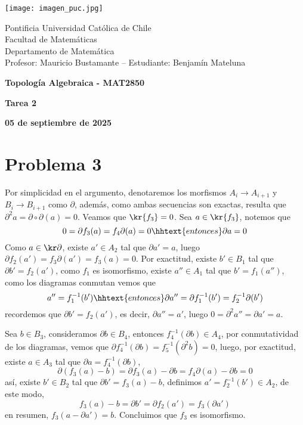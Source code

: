 \documentclass{article}
\begin{document}
\begin{minipage}{2.5cm}
    \texttt{[image: imagen\_puc.jpg]}
\end{minipage}
\begin{minipage}{14cm}
    {\sc Pontificia Universidad Católica de Chile\\
    Facultad de Matemáticas\\
    Departamento de Matemática\\
    Profesor: Mauricio Bustamante -- Estudiante: Benjamín Mateluna}
\end{minipage}
\vspace{1ex}

{\centerline{\bf Topología Algebraica - MAT2850}
\centerline{\bf Tarea 2}}
\centerline{\bf 05 de septiembre de 2025}

\section*{Problema 3} 
\noindent Por simplicidad en el argumento, denotaremos los morfismos $A_{i}\to A_{i+1}$ y 
$B_{i}\to B_{i+1}$ como $\partial$, además, como ambas secuencias son exactas, resulta que 
$\partial^{2}a=\partial\circ\partial (a)=0$. Veamos que $\kr{f_{3}}=0$. Sea $a\in\kr{f_{3}}$,
notemos que
\begin{equation*}
    0=\partial f_{3}(a)=f_{4}\partial(a)=0\hhtext{entonces}\partial a=0
\end{equation*}
Como $a\in\kr\partial$, existe $a'\in A_{2}$ tal que $\partial a'=a$, luego $\partial f_{2}(a')
=f_{3}\partial(a')=f_{3}(a)=0$. Por exactitud, existe $b'\in B_{1}$ tal que $\partial b'
=f_{2}(a')$, como $f_{1}$ es isomorfismo, existe $a''\in A_{1}$ tal que $b'=f_{1}(a'')$, como los
diagramas conmutan vemos que
\begin{equation*}
    a''=f^{-1}_{1}(b')\hhtext{entonces}\partial a''=\partial f^{-1}_{1}(b')=f^{-1}_{2}\partial(b')
\end{equation*}
recordemos que $\partial b'=f_{2}(a')$, es decir, $\partial a''=a'$, luego 
$0=\partial^{2}a''=\partial a'=a$.

\vspace{2mm}
\noindent Sea $b\in B_{3}$, consideramos $\partial b\in B_{4}$, entonces 
$f^{-1}_{4}(\partial b)\in A_{4}$, por conmutatividad de los diagramas, vemos que 
$\partial f_{4}^{-1}(\partial b)=f_{5}^{-1}(\partial^{2}b)=0$, luego, por exactitud, existe
$a\in A_{3}$ tal que $\partial a=f_{4}^{-1}(\partial b)$,
\begin{equation*}
    \partial(f_{3}(a)-b)=\partial f_{3}(a)-\partial b=f_{4}\partial(a)-\partial b=0
\end{equation*}
así, existe $b'\in B_{2}$ tal que $\partial b'=f_{3}(a)-b$, definimos 
$a'=f_{2}^{-1}(b')\in A_{2}$, de este modo,
\begin{equation*}
    f_{3}(a)-b=\partial b'=\partial f_{2}(a')=f_{3}(\partial a')
\end{equation*}
en resumen, $f_{3}(a-\partial a')=b$. Concluimos que $f_{3}$ es isomorfismo.
\end{document}
